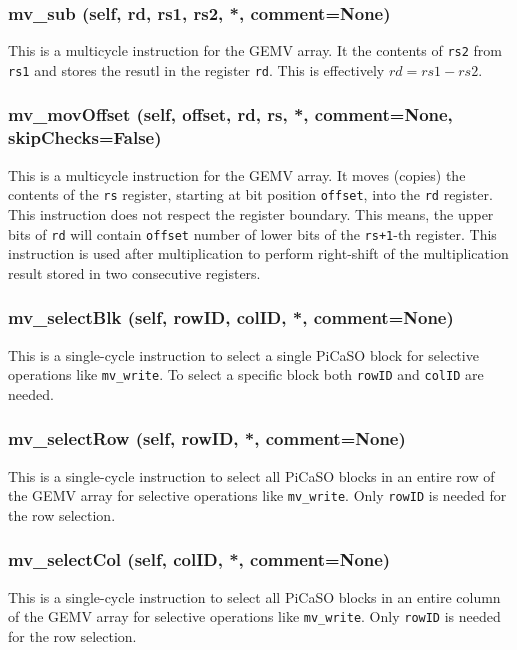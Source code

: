 \documentclass{article}
\begin{document}
\subsubsection*{mv\_sub (self, rd, rs1, rs2, *, comment=None)}
This is a multicycle instruction for the GEMV array.
It the contents of \texttt{rs2} from \texttt{rs1}
and stores the resutl in the register \texttt{rd}. 
This is effectively $rd = rs1 - rs2$.


\subsubsection*{mv\_movOffset (self, offset, rd, rs, *, comment=None, skipChecks=False)}
This is a multicycle instruction for the GEMV array.
It moves (copies) the contents of the \texttt{rs} register, starting at bit
position \texttt{offset}, into the \texttt{rd} register.
This instruction does not respect the register boundary.
This means, the upper bits of \texttt{rd} will contain \texttt{offset} number
of lower bits of the \texttt{rs+1}-th register.
This instruction is used after multiplication to perform right-shift of the multiplication
result stored in two consecutive registers.


\subsubsection*{mv\_selectBlk (self, rowID, colID, *, comment=None)}
This is a single-cycle instruction to select a single PiCaSO block for
selective operations like \texttt{mv\_write}.
To select a specific block both \texttt{rowID} and \texttt{colID} are needed.


\subsubsection*{mv\_selectRow (self, rowID, *, comment=None)}
This is a single-cycle instruction to select all PiCaSO blocks in an entire row
of the GEMV array for selective operations like \texttt{mv\_write}.
Only \texttt{rowID} is needed for the row selection.


\subsubsection*{mv\_selectCol (self, colID, *, comment=None)}
This is a single-cycle instruction to select all PiCaSO blocks in an entire column
of the GEMV array for selective operations like \texttt{mv\_write}.
Only \texttt{rowID} is needed for the row selection.
\end{document}
